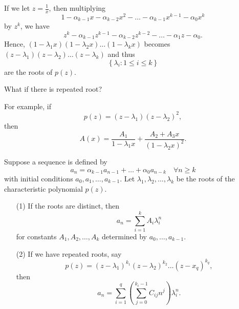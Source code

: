 If we let \(z = \frac{1}{x}\), then multiplying
    \[
        1 - \alpha _{k - 1} x - \alpha _{k - 2} x^2 - \dots - \alpha _{k - 1}x^{k - 1} - \alpha _0 x^k
    \] by \(z^k\), we have 
    \[
        z^k - \alpha _{k - 1} z^{k - 1} - \alpha _{k - 2} z^{k - 2} - \dots - \alpha _1 z - \alpha _0.
    \] Hence, \((1 - \lambda _1 x)(1 - \lambda _2 x) \dots (1 - \lambda _k x)\) becomes \((z - \lambda _1 )(z - \lambda _2) \dots (z - \lambda _k)\) and thus 
    \[
        \left\{ \lambda _i: 1\le i \le k \right\} 
    \] are the roots of \(p(z)\). 

\begin{question}
    What if there is repeated root?
\end{question}
For example, if 
\[
    p(z) = (z - \lambda _1)(z - \lambda _2)^2,        
\] then 
\[
    A(x) = \frac{A_1}{1 - \lambda _1 x} + \frac{A_2 + A_3 x}{(1 - \lambda _2 x)^2}.
\]
\begin{theorem}
Suppose a sequence is defined by 
\[
    a_n = \alpha _{k - 1} a_{n - 1} + \dots + \alpha _0 a_{n - k} \quad \forall n \ge k        
\] with initial conditions \(a_0, a_1, \dots , a_{k - 1}\). Let \(\lambda _1, \lambda _2, \dots ,\lambda _k\) be the roots of the characteristic polynomial \(p(z)\).
\begin{itemize}
    \item [(1)] If the roots are distinct, then 
    \[
        a_n = \sum_{i=1}^{k} A_i \lambda _i^n 
    \] for constants \(A_1, A_2, \dots , A_k\) determined by \(a_0, \dots , a_{k - 1}\). 
    \item [(2)] If we have repeated roots, say 
    \[
        p(z) = (z - \lambda _1)^{k_1} (z - \lambda _2)^{k_2} \dots (z - x_q)^{k_q},
    \]then 
    \[
        a_n = \sum_{i=1}^{q} \left( \sum_{j=0}^{k_i - 1} C_{ij} n^j  \right) \lambda _i^n.  
    \]
\end{itemize}   
\end{theorem}